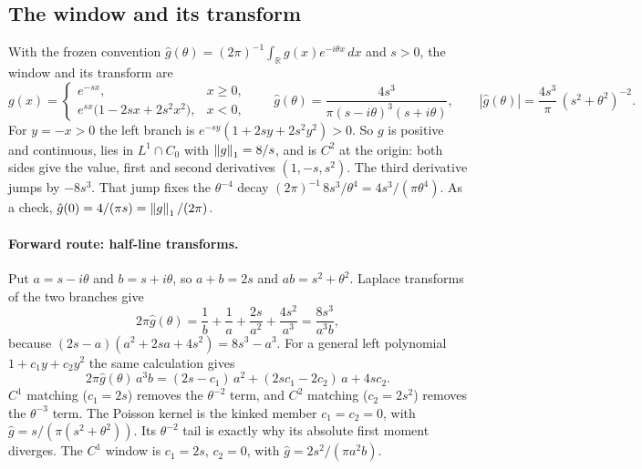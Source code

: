 \subsection{The window and its transform}
\label{sec:av2-window}
With the frozen convention
$\hat g(\theta)=(2\pi)^{-1}\int_{\mathbb R}g(x)e^{-i\theta x}\,dx$ and $s>0$,
the window and its transform are
\begin{equation}
 g(x)=\begin{cases}e^{-sx},&x\ge0,\\ e^{sx}\bigl(1-2sx+2s^2x^2\bigr),&x<0,\end{cases}
 \qquad
 \hat g(\theta)=\frac{4s^3}{\pi(s-i\theta)^3(s+i\theta)},
 \qquad
 |\hat g(\theta)|=\frac{4s^3}{\pi}\,(s^2+\theta^2)^{-2}.
 \label{eq:av2-window}
\end{equation}
For $y=-x>0$ the left branch is $e^{-sy}(1+2sy+2s^2y^2)>0$. So $g$ is positive
and continuous, lies in $L^1\cap C_0$ with $\left\lVert g\right\rVert_1=8/s$, and is $C^2$ at
the origin: both sides give the value, first and second derivatives
$(1,-s,s^2)$. The third derivative jumps by $-8s^3$. That jump fixes the
$\theta^{-4}$ decay $(2\pi)^{-1}\,8s^3/\theta^4=4s^3/(\pi\theta^4)$. As a
check, $\hat g(0)=4/(\pi s)=\left\lVert g\right\rVert_1/(2\pi)$.

\paragraph{Forward route: half-line transforms.}
Put $a=s-i\theta$ and $b=s+i\theta$, so $a+b=2s$ and $ab=s^2+\theta^2$. Laplace
transforms of the two branches give
\begin{equation}
 2\pi\hat g(\theta)=\frac1b+\frac1a+\frac{2s}{a^2}+\frac{4s^2}{a^3}
 =\frac{8s^3}{a^3b},
 \label{eq:av2-halfline}
\end{equation}
because $(2s-a)(a^2+2sa+4s^2)=8s^3-a^3$. For a general left polynomial
$1+c_1y+c_2y^2$ the same calculation gives
\begin{equation}
 2\pi\hat g(\theta)\,a^3b=(2s-c_1)\,a^2+(2sc_1-2c_2)\,a+4sc_2 .
 \label{eq:av2-family}
\end{equation}
$C^1$ matching ($c_1=2s$) removes the $\theta^{-2}$ term, and $C^2$ matching
($c_2=2s^2$) removes the $\theta^{-3}$ term. The Poisson kernel is the kinked
member $c_1=c_2=0$, with $\hat g=s/(\pi(s^2+\theta^2))$. Its $\theta^{-2}$
tail is exactly why its absolute first moment diverges. The $C^1$ window is
$c_1=2s$, $c_2=0$, with $\hat g=2s^2/(\pi a^2b)$.

